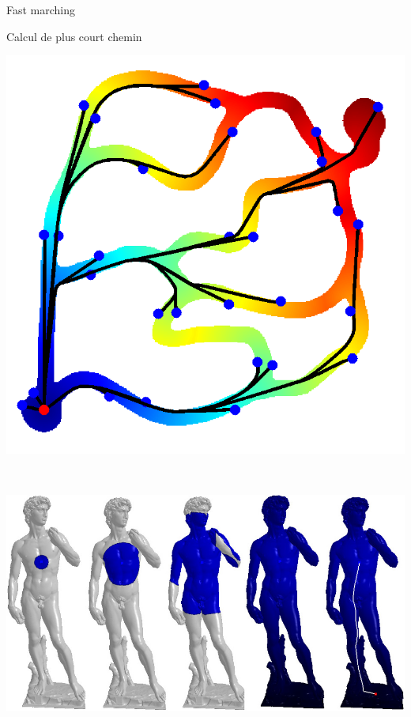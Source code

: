\begin{frame}{Fast marching}

\begin{block}{Calcul de plus court chemin}
\centering


\begin{minipage}{0.45\linewidth}

\includegraphics[width=\linewidth]{images/cavern-geodesics.png}
\end{minipage}
~~~
\begin{minipage}{0.45\linewidth}
\includegraphics[width=\linewidth]{images/test_geodesic.jpg}


\end{minipage}
\end{block}
\end{frame}
